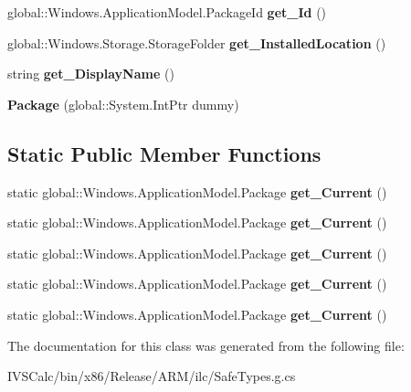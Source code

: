 \begin{DoxyCompactItemize}
global\+::\+Windows.\+Application\+Model.\+Package\+Id {\bfseries get\+\_\+\+Id} ()
\item 
\mbox{\label{class_windows_1_1_application_model_1_1_package_a806299fe1d916b5758d73cd2a9fd49ec}} 
global\+::\+Windows.\+Storage.\+Storage\+Folder {\bfseries get\+\_\+\+Installed\+Location} ()
\item 
\mbox{\label{class_windows_1_1_application_model_1_1_package_a317d75aec1790849c01bb4a23057e36a}} 
string {\bfseries get\+\_\+\+Display\+Name} ()
\item 
\mbox{\label{class_windows_1_1_application_model_1_1_package_a72c00ea4b9b5889235b31657e01833f5}} 
{\bfseries Package} (global\+::\+System.\+Int\+Ptr dummy)
\end{DoxyCompactItemize}
\subsection*{Static Public Member Functions}
\begin{DoxyCompactItemize}
\item 
\mbox{\label{class_windows_1_1_application_model_1_1_package_ade0b1c8546811397a43ee7389d879631}} 
static global\+::\+Windows.\+Application\+Model.\+Package {\bfseries get\+\_\+\+Current} ()
\item 
\mbox{\label{class_windows_1_1_application_model_1_1_package_ade0b1c8546811397a43ee7389d879631}} 
static global\+::\+Windows.\+Application\+Model.\+Package {\bfseries get\+\_\+\+Current} ()
\item 
\mbox{\label{class_windows_1_1_application_model_1_1_package_ade0b1c8546811397a43ee7389d879631}} 
static global\+::\+Windows.\+Application\+Model.\+Package {\bfseries get\+\_\+\+Current} ()
\item 
\mbox{\label{class_windows_1_1_application_model_1_1_package_ade0b1c8546811397a43ee7389d879631}} 
static global\+::\+Windows.\+Application\+Model.\+Package {\bfseries get\+\_\+\+Current} ()
\item 
\mbox{\label{class_windows_1_1_application_model_1_1_package_ade0b1c8546811397a43ee7389d879631}} 
static global\+::\+Windows.\+Application\+Model.\+Package {\bfseries get\+\_\+\+Current} ()
\end{DoxyCompactItemize}


The documentation for this class was generated from the following file\+:\begin{DoxyCompactItemize}
\item 
I\+V\+S\+Calc/bin/x86/\+Release/\+A\+R\+M/ilc/Safe\+Types.\+g.\+cs\end{DoxyCompactItemize}
